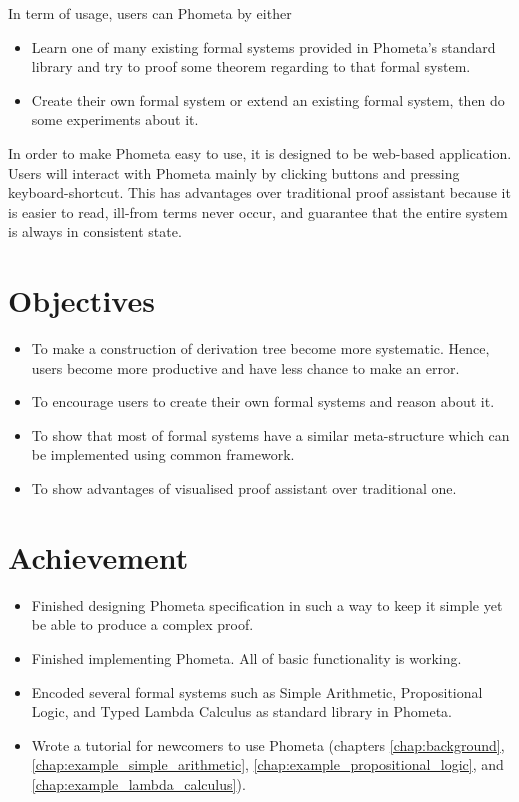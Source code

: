 \documentclass[master.tex]{subfiles}
\begin{document}
In term of usage, users can Phometa by either
\begin{itemize}
\item Learn one of many existing formal systems provided in Phometa's standard
  library and try to proof some theorem regarding to that formal system.
\item Create their own formal system or extend an existing formal system, then
  do some experiments about it.
\end{itemize}

In order to make Phometa easy to use, it is designed to be web-based
application. Users will interact with Phometa mainly by clicking buttons and
pressing keyboard-shortcut. This has advantages over traditional proof assistant
because it is easier to read, ill-from terms never occur, and guarantee that the
entire system is always in consistent state.

\section{Objectives}
\begin{itemize}
  \item To make a construction of derivation tree become more systematic. Hence, users become more productive and have less chance to make an error.
  \item To encourage users to create their own formal systems and reason about it.
  \item To show that most of formal systems have a similar meta-structure which can be implemented using common framework.
  \item To show advantages of visualised proof assistant over traditional one.
\end{itemize}

\section{Achievement}
\begin{itemize}
\item Finished designing Phometa specification in such a way to keep it simple yet be able
  to produce a complex proof.
\item Finished implementing Phometa. All of basic functionality is working.
\item Encoded several formal systems such as Simple Arithmetic, Propositional Logic, and Typed Lambda Calculus
  as standard library in Phometa.
\item Wrote a tutorial for newcomers to use Phometa (chapters
  \ref{chap:background}, \ref{chap:example_simple_arithmetic},
  \ref{chap:example_propositional_logic}, and
  \ref{chap:example_lambda_calculus}).
\end{itemize}
\end{document}
